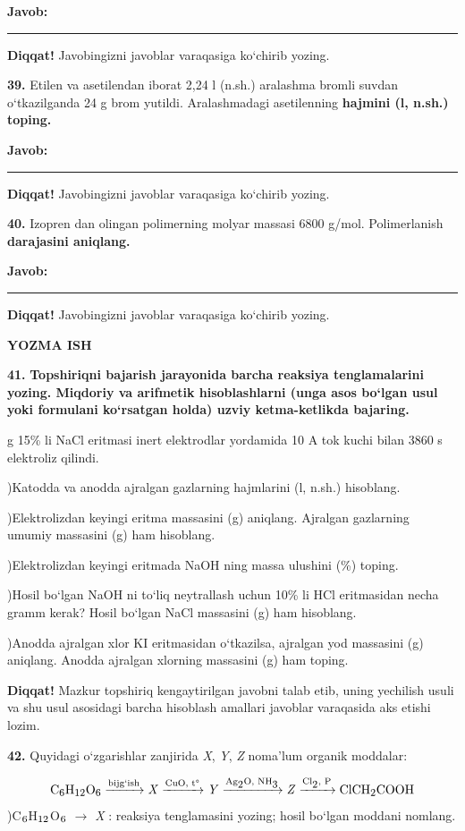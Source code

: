 \documentclass[11pt,a4paper]{article}
\renewcommand{\textsubscript}[1]{\ensuremath{_{\text{\fontsize{8}{8}\selectfont #1}}}}
\newcommand{\diqqat}[1]{\par\smallskip\noindent\textbf{Diqqat!} #1\par\medskip}
\newcommand{\javob}{\par\smallskip\noindent\textbf{Javob:} \rule[-2pt]{7.5cm}{0.4pt}\par\smallskip\noindent\textbf{Diqqat!} Javobingizni javoblar varaqasiga ko`chirib yozing.\par\medskip}
\begin{document}
\javob
\noindent\textbf{39.} Etilen va asetilendan iborat 2,24 l (n.sh.) aralashma bromli suvdan o`tkazilganda 24 g brom yutildi. Aralashmadagi asetilenning \textbf{hajmini (l, n.sh.) toping.}
\javob
\noindent\textbf{40.} Izopren dan olingan polimerning molyar massasi 6800 g/mol. Polimerlanish \textbf{darajasini aniqlang.}
\javob
\par\bigskip\begin{center}\textbf{\fontsize{13}{15}\selectfont YOZMA ISH}\end{center}
\noindent\textbf{41.} \textbf{Topshiriqni bajarish jarayonida barcha reaksiya tenglamalarini yozing. Miqdoriy va arifmetik hisoblashlarni (unga asos bo`lgan usul yoki formulani ko`rsatgan holda) uzviy ketma-ketlikda bajaring.}\par{} g 15\% li NaCl eritmasi inert elektrodlar yordamida 10 A tok kuchi bilan 3860 s elektroliz qilindi.\par
{})Katodda va anodda ajralgan gazlarning hajmlarini (l, n.sh.) hisoblang.\par
{})Elektrolizdan keyingi eritma massasini (g) aniqlang. Ajralgan gazlarning umumiy massasini (g) ham hisoblang.\par
{})Elektrolizdan keyingi eritmada NaOH ning massa ulushini (\%) toping.\par
{})Hosil bo`lgan NaOH ni to`liq neytrallash uchun 10\% li HCl eritmasidan necha gramm kerak? Hosil bo`lgan NaCl massasini (g) ham hisoblang.\par
{})Anodda ajralgan xlor KI eritmasidan o`tkazilsa, ajralgan yod massasini (g) aniqlang. Anodda ajralgan xlorning massasini (g) ham toping.\par
\diqqat{Mazkur topshiriq kengaytirilgan javobni talab etib, uning yechilish usuli va shu usul asosidagi barcha hisoblash amallari javoblar varaqasida aks etishi lozim.}
\noindent\textbf{42.} Quyidagi o`zgarishlar zanjirida \textit{X}, \textit{Y}, \textit{Z} noma'lum organik moddalar:\par
\[\setlength{\fboxsep}{0pt}\text{C\textsubscript{6}H\textsubscript{12}O\textsubscript{6}}\xrightarrow{\text{bijg`ish}}\text{\textit{X}}\xrightarrow{\text{CuO, t\textdegree{}}}\text{\textit{Y}}\xrightarrow{\text{Ag\textsubscript{2}O, NH\textsubscript{3}}}\text{\textit{Z}}\xrightarrow{\text{Cl\textsubscript{2}, P}}\text{ClCH\textsubscript{2}COOH}\]
)C\textsubscript{6}H\textsubscript{12}O\textsubscript{6} $\to$ \textit{X} : reaksiya tenglamasini yozing; hosil bo`lgan moddani nomlang.\par
\end{document}
